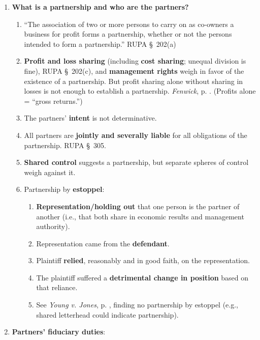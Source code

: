 \begin{enumerate}
    \item \textbf{What is a partnership and who are the partners?}
    \begin{enumerate}
        \item ``The association of two or more persons to carry on as 
        co-owners a business for profit forms a partnership, whether or not 
        the persons intended to form a partnership.'' RUPA \S\ 202(a)
        \item \textbf{Profit and loss sharing} (including \textbf{cost 
        sharing}; unequal division is fine), RUPA \S\ 202(c), and 
        \textbf{management rights} weigh in favor of the existence of a 
        partnership. But profit sharing alone without sharing in losses is not 
        enough to establish a partnership.  \emph{Fenwick}, p. 
        \pageref{par:fenwick-ucc}. (Profits alone = ``gross returns.'')
        \item The partners' \textbf{intent} is not determinative.
        \item All partners are \textbf{jointly and severally liable} for all 
        obligations of the partnership. RUPA \S\ 305.
        \item \textbf{Shared control} suggests a partnership, but separate 
        spheres of control weigh against it.
        \item Partnership by \textbf{estoppel}:
        \begin{enumerate}
            \item \textbf{Representation/holding out} that one person is the 
            partner of another (i.e., that both share in economic results and 
            management authority).
            \item Representation came from the \textbf{defendant}.
            \item Plaintiff \textbf{relied}, reasonably and in good faith, on 
            the representation.
            \item The plaintiff suffered a \textbf{detrimental change in 
            position} based on that reliance.
            \item See \emph{Young v. Jones}, p. \pageref{par:young}, finding 
            no partnership by estoppel (e.g., shared letterhead could indicate 
            partnership).
        \end{enumerate}
    \end{enumerate}
    \item \textbf{Partners' fiduciary duties}:

\end{enumerate}
